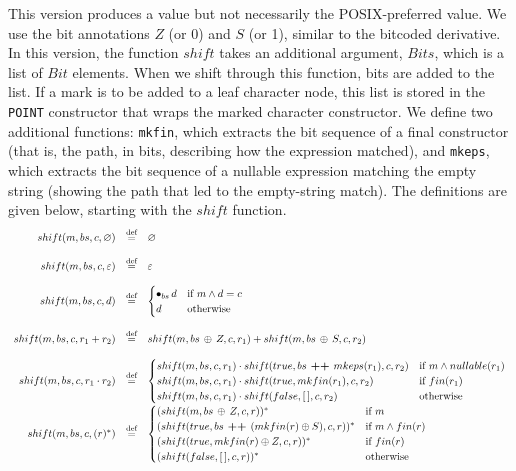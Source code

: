 \documentclass[12pt]{article}
\begin{document}
This version produces a value but not necessarily the POSIX-preferred value. We use the bit annotations $Z$ 
(or 0) and $S$ (or 1), similar to the bitcoded derivative. In this version, the function $shift$ takes an 
additional argument, $Bits$, which is a list of $Bit$ elements. When we shift through this function, bits 
are added to the list. If a mark is to be added to a leaf character node, this list is stored in the 
\texttt{POINT} constructor that wraps the marked character constructor.
We define two additional functions: \texttt{mkfin}, which extracts the bit sequence of a final constructor 
(that is, the path, in bits, describing how the expression matched), and \texttt{mkeps}, which extracts the
 bit sequence of a nullable expression matching the empty string (showing the path that led to the 
 empty-string match). The definitions are given below, starting with the $shift$ function.
\[
\begin{array}{rcl}
  shift(m,bs,c,\varnothing)              & \stackrel{\text{def}}{=} & \varnothing \\\\
  shift(m,bs,c,\varepsilon)              & \stackrel{\text{def}}{=} & \varepsilon \\\\
  shift(m,bs,c,d)              & \stackrel{\text{def}}{=} & 
   \begin{cases}
    \bullet_{bs} \, d & \text{if  $ m \land d = c $}\\
    d                 & \text{otherwise}
   \end{cases} \\\\

  shift(m,bs,c, r_1 + r_2)     & \stackrel{\text{def}}{=} & shift(m,bs \, \oplus \, Z,c,r_1) + shift(m,bs \, \oplus \, S,c,r_2) \\\\
  
  shift(m,bs,c, r_1 \cdot r_2) & \stackrel{\text{def}}{=} &
  \begin{cases}
      shift(m,bs,c,r_1)  \cdot shift(true,bs \textbf{ ++ } mkeps(r_1),c,r_2) & \text{if $ m \land nullable(r_1) $}\\
      shift(m,bs,c,r_1)  \cdot shift(true,mkfin(r_1),c,r_2)                  & \text{if $ fin(r_1) $}\\
      shift(m,bs,c,r_1)  \cdot shift(false,[\,],c,r_2)                       & \text{otherwise} 
    \end{cases}  \\

  shift(m,bs,c,(r)^*)          & \stackrel{\text{def}}{=} &
    \begin{cases}
      (shift(m,bs \, \oplus \, Z,c,r))^*                & \text{if $ m $} \\
      (shift(true,bs \textbf{ ++ } (mkfin(r) \oplus S),c,r))^* & \text{if \( m \land fin(r) \)} \\
      (shift(true,mkfin(r) \oplus Z,c,r))^* & \text{if \( fin(r) \)} \\
      (shift(false,[\,],c,r))^*           & \text{otherwise}
    \end{cases}
\end{array}
\]
\end{document}
